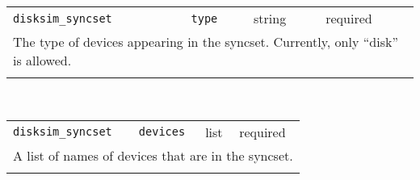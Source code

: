 \noindent 
\begin{tabular}{|p{1.5in}|p{3.5in}|p{0.5in}|p{0.5in}|}
\cline{1-4}
\texttt{disksim\_syncset} & \texttt{type} & string & required \\ 
\cline{1-4}
\multicolumn{4}{|p{6in}|}{
The type of devices appearing in the syncset. Currently, only
``disk'' is allowed.
}\\ 
\cline{1-4}
\multicolumn{4}{p{5in}}{}\\
\end{tabular}\\ 
\noindent 
\begin{tabular}{|p{1.5in}|p{3.5in}|p{0.5in}|p{0.5in}|}
\cline{1-4}
\texttt{disksim\_syncset} & \texttt{devices} & list & required \\ 
\cline{1-4}
\multicolumn{4}{|p{6in}|}{
A list of names of devices that are in the syncset.
}\\ 
\cline{1-4}
\multicolumn{4}{p{5in}}{}\\
\end{tabular}\\ 
